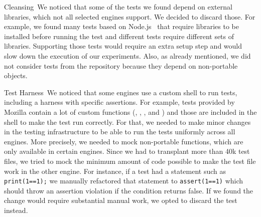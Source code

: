 \documentclass[smallextended]{svjour3}
\begin{document}

\lbrack{}Cleansing\rbrack{}~We noticed that some of the tests we found
depend on external libraries, which not all selected engines
support. We decided to discard those. For example, we found many tests
based on Node.js~\cite{node} that
require libraries to be installed before running the test and
different tests require different sets of libraries. Supporting those
tests would require an extra setup step and would slow down the
execution of our experiments. Also, as already mentioned, we did not
consider tests from the \chakra{} repository because they depend on
non-portable objects.

\lbrack{}Test Harness\rbrack{}~We noticed that some engines use a
custom shell to run tests, including a harness with specific
assertions. For example, tests provided by Mozilla contain a lot of
custom functions (\eg{}, ,
, and ) and those are
included in the shell to make the test run correctly.  For that, we
needed to make minor changes in the testing infrastructure to be able
to run the tests uniformly across all engines. More precisely, we
needed to mock non-portable functions, which are only available in
certain engines. Since we had to transplant more than 40k test files,
we tried to mock the minimum amount of code possible to make the test
file work in the other engine. For instance, if a test had a statement
such as \texttt{print(1==1);} we manually refactored that statement to
\texttt{assert(1==1)} which should throw an assertion violation if the
condition returns false.  If we found the change would require
substantial manual work, we opted to discard the test instead.

\end{document}
